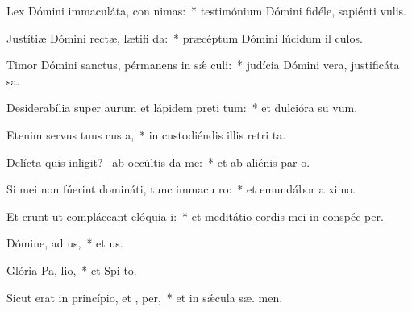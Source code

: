 \item Lex Dómini immaculáta, con nimas:~* testimónium Dómini fidéle, sapiénti  vulis.
\item Justítiæ Dómini rectæ, lætifi da:~* præcéptum Dómini lúcidum il culos.
\item Timor Dómini sanctus, pérmanens in sǽ culi:~* judícia Dómini vera, justificáta  sa.
\item Desiderabília super aurum et lápidem preti tum:~* et dulcióra su   vum.
\item Etenim servus tuus cus a,~* in custodiéndis illis retri ta.
\item Delícta quis inligit?~\pscross{} ab occúltis  da me:~* et ab aliénis par  o.
\item Si mei non fúerint domináti, tunc immacu ro:~* et emundábor a  ximo.
\item Et erunt ut compláceant elóquia  i:~* et meditátio cordis mei in conspéc  per.
\item Dómine, ad us,~* et  us.
\item Glória Pa,  lio,~* et Spi to.
\item Sicut erat in princípio, et ,  per,~* et in sǽcula sæ. men.
